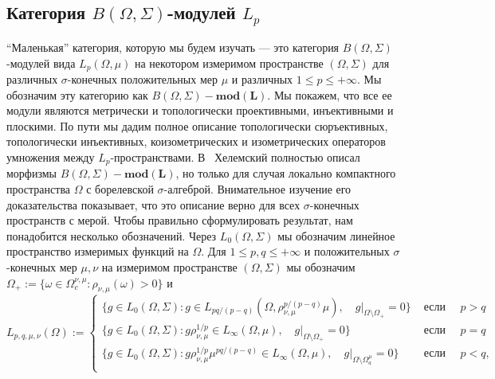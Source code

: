 
\subsection{Категория 
    \texorpdfstring{$B(\Omega,\Sigma)$}{B (Omega,Sigma)}-модулей
    \texorpdfstring{$L_p$}{Lp}}\label{
        SubSectionTheCategoryOfBOmegaSigmaModulesLp}

``Маленькая'' категория, которую мы будем изучать --- это категория
$B(\Omega,\Sigma)$-модулей вида $L_p(\Omega,\mu)$ на некотором измеримом
пространстве $(\Omega,\Sigma)$ для различных $\sigma$-конечных положительных мер
$\mu$ и различных $1\leq p\leq +\infty$. Мы обозначим эту категорию как
$B(\Omega,\Sigma)-\mathbf{mod(L)}$. Мы покажем, что все ее модули являются
метрически и топологически проективными, инъективными и плоскими. По пути мы
дадим полное описание топологически сюръективных, топологически инъективных,
коизометрических и изометрических операторов умножения между
$L_p$-пространствами. В~\cite{HelTensProdAndMultModLp} Хелемский полностью
описал морфизмы $B(\Omega,\Sigma)-\mathbf{mod(L)}$, но только для случая
локально компактного пространства $\Omega$ с борелевской $\sigma$-алгеброй.
Внимательное изучение его доказательства показывает, что это описание верно для
всех $\sigma$-конечных пространств с мерой. Чтобы правильно сформулировать
результат, нам понадобится несколько обозначений. Через $L_0(\Omega,\Sigma)$ мы
обозначим линейное пространство измеримых функций на $\Omega$. Для $1\leq
p,q\leq +\infty$ и положительных $\sigma$-конечных мер $\mu,\nu$ на измеримом
пространстве $(\Omega,\Sigma)$ мы обозначим $\Omega_+:=
\{\omega\in\Omega_c^{\nu,\mu}:\rho_{\nu,\mu}(\omega)>0 \}$ и
$$
L_{p,q,\mu,\nu}(\Omega):=
\begin{cases}
 \{g\in L_0(\Omega,\Sigma)
    :g\in L_{pq/(p-q)}(\Omega,\rho_{\nu,\mu}^{p/(p-q)}\mu),\quad 
    g|_{\Omega\setminus\Omega_+}=0 \}&\text{ если }\quad p>q\\
 \{g\in L_0(\Omega,\Sigma)
    :g\rho_{\nu,\mu}^{1/p}\in L_{\infty}(\Omega,\mu),\quad 
    g|_{\Omega\setminus\Omega_+}=0 \}&\text{ если }\quad p=q\\
 \{g\in L_0(\Omega,\Sigma)
    :g\rho_{\nu,\mu}^{1/p}\mu^{pq/(p-q)}\in L_{\infty}(\Omega,\mu),\quad 
    g|_{\Omega\setminus\Omega_a^{\mu}}=0 \}&\text{ если }\quad p<q,\\
\end{cases}
$$

